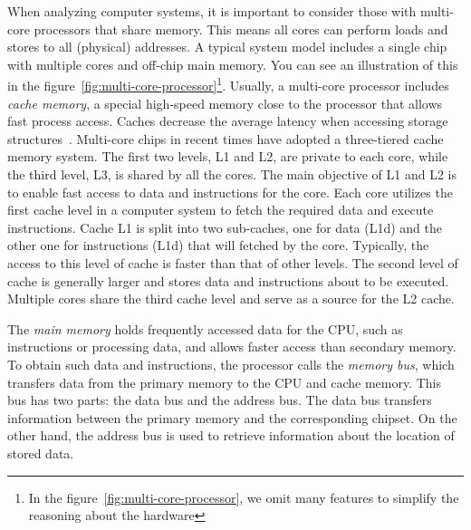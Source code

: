 When analyzing computer systems, it is important to consider those with multi-core processors that share memory. This means all cores can perform loads and stores to all (physical) addresses. A typical system model includes a single chip with multiple cores and off-chip main memory. You can see an illustration of this in the figure~\ref{fig:multi-core-processor}\footnote{In the figure~\ref{fig:multi-core-processor}, we omit many features to simplify the reasoning about the hardware}. Usually, a multi-core processor includes \emph{cache memory}, a special high-speed memory close to the processor that allows fast process access. Caches decrease the average latency when accessing storage structures~\cite{DBLP_series_synthesis_2020Nagarajan}. Multi-core chips in recent times have adopted a three-tiered cache memory system. The first two levels, L1 and L2, are private to each core, while the third level, L3, is shared by all the cores. The main objective of L1 and L2 is to enable fast access to data and instructions for the core. Each core utilizes the first cache level in a computer system to fetch the required data and execute instructions. Cache L1 is split into two sub-caches, one for data (L1d) and the other one for instructions (L1d) that will fetched by the core. Typically, the access to this level of cache is faster than that of other levels. The second level of cache is generally larger and stores data and instructions about to be executed. Multiple cores share the third cache level and serve as a source for the L2 cache.

The \emph{main memory} holds frequently accessed data for the CPU, such as instructions or processing data, and allows faster access than secondary memory. To obtain such data and instructions, the processor calls the \emph{memory bus}, which transfers data from the primary memory to the CPU and cache memory. This bus has two parts: the data bus and the address bus. The data bus transfers information between the primary memory and the corresponding chipset. On the other hand, the address bus is used to retrieve information about the location of stored data.


